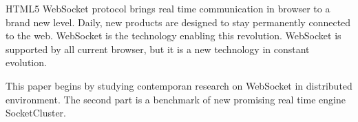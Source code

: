 HTML5 WebSocket protocol brings real time communication in browser to a brand
new level. Daily, new products are designed to stay permanently connected to
the web. WebSocket is the technology enabling this revolution. WebSocket is 
supported by all current browser, but it is a new technology in constant evolution.

This paper begins by studying contemporan research on WebSocket in distributed
environment. The second part is a benchmark of new promising real time engine 
SocketCluster.





